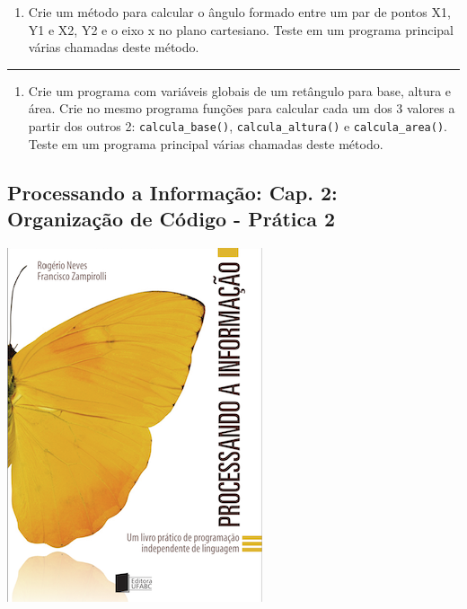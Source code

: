 \documentclass[12pt,a4paper]{article}
\providecommand{\tightlist}{%
      \setlength{\itemsep}{0pt}\setlength{\parskip}{0pt}}
\begin{document}
\begin{enumerate}
\def\labelenumi{\arabic{enumi}.}
\setcounter{enumi}{3}
\tightlist
\item
  Crie um método para calcular o ângulo formado entre um par de pontos
  X1, Y1 e X2, Y2 e o eixo x no plano cartesiano. Teste em um programa
  principal várias chamadas deste método.
\end{enumerate}

    \begin{center}\rule{0.5\linewidth}{0.5pt}\end{center}

\begin{enumerate}
\def\labelenumi{\arabic{enumi}.}
\setcounter{enumi}{4}
\tightlist
\item
  Crie um programa com variáveis globais de um retângulo para base,
  altura e área. Crie no mesmo programa funções para calcular cada um
  dos 3 valores a partir dos outros 2: \texttt{calcula\_base()},
  \texttt{calcula\_altura()} e \texttt{calcula\_area()}. Teste em um
  programa principal várias chamadas deste método.
\end{enumerate}

    \hypertarget{processando-a-informauxe7uxe3o-cap.-2-organizauxe7uxe3o-de-cuxf3digo---pruxe1tica-2}{%
\subsection{Processando a Informação: Cap. 2: Organização de Código -
Prática
2}\label{processando-a-informauxe7uxe3o-cap.-2-organizauxe7uxe3o-de-cuxf3digo---pruxe1tica-2}}

    \includegraphics{"figs/Capa_Processando_Informacao.jpg"}
\end{document}

